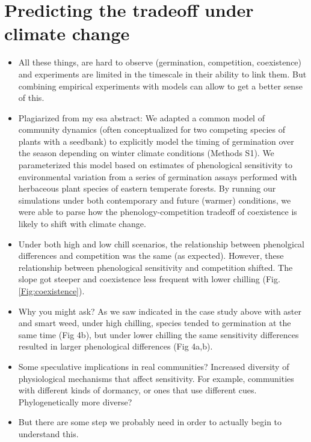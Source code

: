 \documentclass{article}[12pt]
\begin{document}
\section*{Predicting the tradeoff under climate change}
\begin{itemize}
\item All these things, are hard to observe (germination, competition, coexistence) and experiments are limited in the timescale in their ability to link them. But combining empirical experiments with models can allow to get a better sense of this.
\item Plagiarized from my esa abstract: We adapted a common model of community dynamics (often conceptualized for two competing species of plants with a seedbank) to explicitly model the timing of germination over the season depending on winter climate conditions (Methods S1). We parameterized this model based on estimates of phenological sensitivity to environmental variation from a series of germination assays performed with herbaceous plant species of eastern temperate forests. By running our simulations under both contemporary and future (warmer) conditions, we were able to parse how the phenology-competition tradeoff of coexistence is likely to shift with climate change. 

\item Under both high and low chill scenarios, the relationship between phenolgical differences and competition was the same (as expected).  However, these relationship between phenological sensitivity and competition shifted. The slope got steeper and coexistence less frequent with lower chilling (Fig. \ref{Fig:coexistence}). 

\item Why you might ask? As we saw indicated in the case study above with aster and smart weed, under high chilling, species tended to germination at the same time (Fig 4b), but under lower chilling the same sensitivity differences resulted in larger phenological differences (Fig 4a,b).

\item Some speculative implications in real communities? Increased diversity of physiological mechanisms that affect sensitivity. For example, communities with different kinds of dormancy, or ones that use different cues. Phylogenetically more diverse?

\item But there are some step we probably need in order to actually begin to understand this.
\end{itemize}
\end{document}
